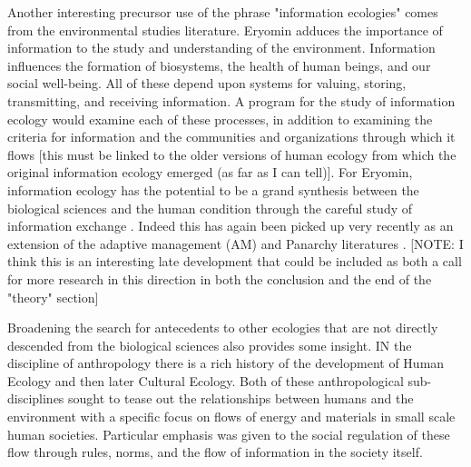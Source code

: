 Another interesting precursor use of the phrase "information ecologies" comes from the environmental studies literature. Eryomin adduces the importance of information to the study and understanding of the environment. Information influences the formation of biosystems, the health of human beings, and our social well-being. All of these depend upon systems for valuing, storing, transmitting, and receiving information. A program for the study of information ecology would examine each of these processes, in addition to examining the criteria for information and the communities and organizations through which it flows [this must be linked to the older versions of human ecology from which the original information ecology emerged (as far as I can tell)]. For Eryomin, information ecology has the potential to be a grand synthesis between the biological sciences and the human condition through the careful study of information exchange \citep{eryomin_information_1998}. Indeed this has again been picked up very recently as an extension of the adaptive management (AM) and Panarchy literatures \citep{eddy_information_2014}. [NOTE: I think this is an interesting late development that could be included as both a call for more research in this direction in both the conclusion and the end of the "theory" section]

Broadening the search for antecedents to other ecologies that are not directly descended from the biological sciences also provides some insight. IN the discipline of anthropology there is a rich history of the development of Human Ecology and then later Cultural Ecology. Both of these anthropological sub-disciplines sought to tease out the relationships between humans and the environment with a specific focus on flows of energy and materials in small scale human societies. Particular emphasis was given to the social regulation of these flow through rules, norms, and the flow of information in the society itself. 
 

